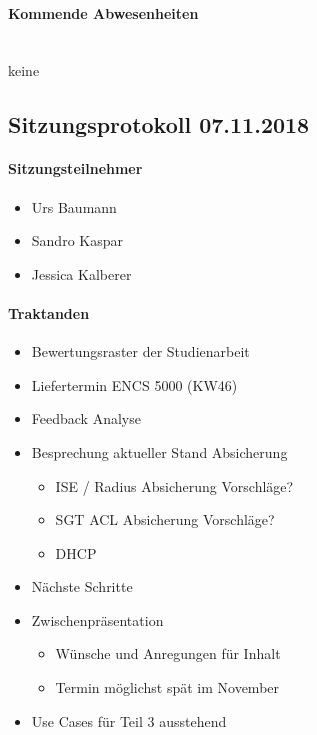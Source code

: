 \paragraph{Kommende Abwesenheiten} \mbox{}\\
keine

\newpage



\subsection{Sitzungsprotokoll 07.11.2018}

\paragraph{Sitzungsteilnehmer}
\begin{itemize}	
	\item Urs Baumann
	\item Sandro Kaspar
	\item Jessica Kalberer
\end{itemize}

\paragraph{Traktanden}
\begin{itemize}	
	\item Bewertungsraster der Studienarbeit
	\item Liefertermin ENCS 5000 (KW46)
	\item Feedback Analyse
	\item Besprechung aktueller Stand Absicherung
	\begin{itemize}
		\item ISE / Radius Absicherung Vorschläge?
		\item SGT ACL Absicherung Vorschläge?
		\item DHCP
	\end{itemize}
	\item Nächste Schritte
	\item Zwischenpräsentation 
	\begin{itemize}
		\item Wünsche und Anregungen für Inhalt
		\item Termin möglichst spät im November
	\end{itemize}
	\item Use Cases für Teil 3 ausstehend
\end{itemize}

